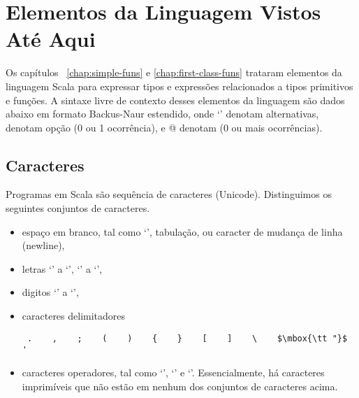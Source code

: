 \section{Elementos da Linguagem Vistos At\'{e} Aqui}
 Os cap\'{i}tulos ~\ref{chap:simple-funs} e \ref{chap:first-class-funs} trataram
elementos da linguagem Scala para expressar tipos e express\~{o}es relacionados a
tipos primitivos e fun\c{c}\~{o}es. A sintaxe livre de contexto desses elementos da
linguagem s\~{a}o dados abaixo em formato Backus-Naur estendido, onde `\code{|}'
denotam alternativas, \code{[...]} denotam op\c{c}\~{a}o  (0 ou 1 ocorr\^{e}ncia), e  
@ denotam (0 ou mais ocorr\^{e}ncias). 
\subsection*{Caracteres}
Programas em Scala s\~{a}o sequ\^{e}ncia de caracteres (Unicode). Distinguimos os
seguintes conjuntos de caracteres.
 \begin{itemize}
 \item
espa\c{c}o em branco, tal como `\code{ }', tabula\c{c}\~{a}o, ou caracter de mudan\c{c}a de linha (newline), 
 \item
letras `' a `', `' a `',    
 \item
digitos `' a `',   
 \item
caracteres delimitadores
 \begin{lstlisting}
 .    ,    ;    (    )    {    }    [    ]    \    $\mbox{\tt "}$    '
 \end{lstlisting}
 \item
caracteres operadores, tal como `\code{#}', `\code{+}' e `\code{:}'.
Essencialmente, h\'{a} caracteres imprim\'{i}veis que n\~{a}o est\~{a}o em nenhum dos 
conjuntos de caracteres acima.   
 \end{itemize}

